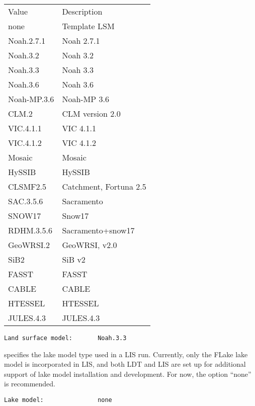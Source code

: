  \begin{tabular}{ll}
 Value       & Description         \\
 none        & Template LSM        \\
 Noah.2.7.1  & Noah 2.7.1          \\
 Noah.3.2    & Noah 3.2            \\
 Noah.3.3    & Noah 3.3            \\
 Noah.3.6    & Noah 3.6            \\
 Noah-MP.3.6 & Noah-MP 3.6         \\
 CLM.2       & CLM version 2.0     \\
 VIC.4.1.1   & VIC 4.1.1           \\
 VIC.4.1.2   & VIC 4.1.2           \\
 Mosaic      & Mosaic              \\
 HySSIB      & HySSIB              \\
 CLSMF2.5    & Catchment, Fortuna 2.5 \\
 SAC.3.5.6   & Sacramento          \\
 SNOW17      & Snow17              \\
 RDHM.3.5.6  & Sacramento+snow17   \\
 GeoWRSI.2   & GeoWRSI, v2.0       \\
 
 SiB2        & SiB v2              \\
 FASST       & FASST               \\
 CABLE       & CABLE               \\
 HTESSEL     & HTESSEL             \\
 JULES.4.3   & JULES.4.3           \\
 
 \end{tabular}
 

 \begin{Verbatim}[frame=single]
Land surface model:       Noah.3.3
 \end{Verbatim}

 
  specifies the lake model type used in a LIS run.
 Currently, only the FLake lake model is incorporated in LIS,
 and both LDT and LIS are set up for additional support of lake
 model installation and development.  For now, the option ``none''
 is recommended.
 

 \begin{Verbatim}[frame=single]
Lake model:               none
 \end{Verbatim}


